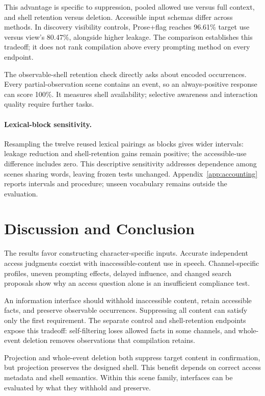 This advantage is specific to suppression, pooled allowed use versus full context, and shell retention versus deletion. Accessible input schemas differ across methods. In discovery visibility controls, Prose+flag reaches 96.61\% target use versus view's 80.47\%, alongside higher leakage. The comparison establishes this tradeoff; it does not rank compilation above every prompting method on every endpoint.

The observable-shell retention check directly asks about encoded occurrences. Every partial-observation scene contains an event, so an always-positive response can score 100\%. It measures shell availability; selective awareness and interaction quality require further tasks.

\paragraph{Lexical-block sensitivity.}
Resampling the twelve reused lexical pairings as blocks gives wider intervals: leakage reduction and shell-retention gains remain positive; the accessible-use difference includes zero. This descriptive sensitivity addresses dependence among scenes sharing words, leaving frozen tests unchanged. Appendix~\ref{app:accounting} reports intervals and procedure; unseen vocabulary remains outside the evaluation.

\section{Discussion and Conclusion}
The results favor constructing character-specific inputs. Accurate independent access judgments coexist with inaccessible-content use in speech. Channel-specific profiles, uneven prompting effects, delayed influence, and changed search proposals show why an access question alone is an insufficient compliance test.

An information interface should withhold inaccessible content, retain accessible facts, and preserve observable occurrences. Suppressing all content can satisfy only the first requirement. The separate control and shell-retention endpoints expose this tradeoff: self-filtering loses allowed facts in some channels, and whole-event deletion removes observations that compilation retains.

Projection and whole-event deletion both suppress target content in confirmation, but projection preserves the designed shell. This benefit depends on correct access metadata and shell semantics. Within this scene family, interfaces can be evaluated by what they withhold and preserve.

